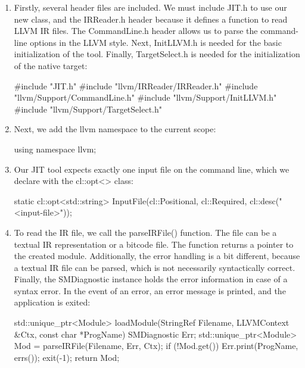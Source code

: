 \begin{enumerate}
\item
Firstly, several header files are included. We must include JIT.h to use our new class, and the IRReader.h header because it defines a function to read LLVM IR files. The CommandLine.h header allows us to parse the command-line options in the LLVM style. Next, InitLLVM.h is needed for the basic initialization of the tool. Finally, TargetSelect.h is needed for the initialization of the native target:

\begin{cpp}
#include "JIT.h"
#include "llvm/IRReader/IRReader.h"
#include "llvm/Support/CommandLine.h"
#include "llvm/Support/InitLLVM.h"
#include "llvm/Support/TargetSelect.h"
\end{cpp}

\item
Next, we add the llvm namespace to the current scope:

\begin{cpp}
using namespace llvm;
\end{cpp}

\item
Our JIT tool expects exactly one input file on the command line, which we declare with the cl::opt<> class:

\begin{cpp}
static cl::opt<std::string>
    InputFile(cl::Positional, cl::Required,
        cl::desc("<input-file>"));
\end{cpp}

\item
To read the IR file, we call the parseIRFile() function. The file can be a textual IR representation or a bitcode file. The function returns a pointer to the created module. Additionally, the error handling is a bit different, because a textual IR file can be parsed, which is not necessarily syntactically correct. Finally, the SMDiagnostic instance holds the error information in case of a syntax error. In the event of an error, an error message is printed, and the application is exited:

\begin{cpp}
std::unique_ptr<Module>
loadModule(StringRef Filename, LLVMContext &Ctx,
            const char *ProgName) {
    SMDiagnostic Err;
    std::unique_ptr<Module> Mod =
        parseIRFile(Filename, Err, Ctx);
    if (!Mod.get()) {
        Err.print(ProgName, errs());
        exit(-1);
    }
    return Mod;
}
\end{cpp}


\end{enumerate}
